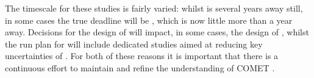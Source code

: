The timescale for these studies is fairly varied: whilst \phaseII is several years away still, in some cases the true deadline will be \phaseI, which is now little more than a year away.
Decisions for the design of \phaseI will impact, in some cases, the design of \phaseII, whilst the run plan for \phaseI will include dedicated studies aimed at reducing key uncertainties of \phaseII.
For both of these reasons it is important that there is a continuous effort to maintain and refine the understanding of COMET \phaseII.
